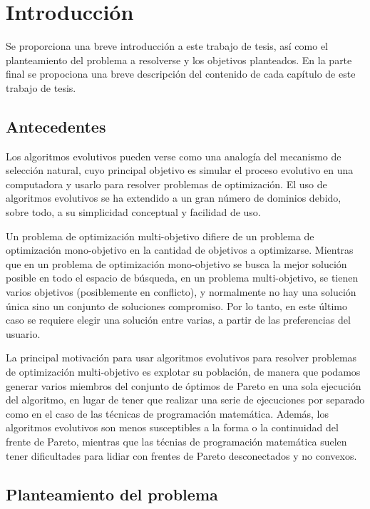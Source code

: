 \chapter*{Introducci\'on}
  Se proporciona una breve introducci\'on a este trabajo de tesis, as\'i como el planteamiento del problema 
  a resolverse y los objetivos planteados. En la parte final se propociona una breve descripci\'on 
  del contenido de cada cap\'itulo de este trabajo de tesis.

\section*{Antecedentes}

  Los algoritmos evolutivos pueden verse como una analog\'ia del mecanismo de selecci\'on natural, cuyo principal objetivo es 
  simular el proceso evolutivo en una computadora y usarlo para resolver problemas de optimizaci\'on. El uso de 
  algoritmos evolutivos se ha extendido a un gran n\'umero de dominios debido, sobre todo, a su simplicidad conceptual
  y facilidad de uso.
  
  Un problema de optimizaci\'on multi-objetivo difiere de un problema de  optimizaci\'on mono-objetivo en la cantidad de 
  objetivos a optimizarse. Mientras que en un problema de optimizaci\'on mono-objetivo se busca la mejor soluci\'on posible 
  en todo el espacio de b\'usqueda, en un problema multi-objetivo, se tienen varios objetivos (posiblemente 
  en conflicto), y normalmente no hay una soluci\'on \'unica sino un conjunto de soluciones compromiso. Por lo tanto, en este 
  \'ultimo caso se requiere elegir una soluci\'on entre varias, a partir de las preferencias del usuario.
  
  La principal motivaci\'on para usar algoritmos evolutivos para resolver problemas de optimizaci\'on multi-objetivo  
  es explotar su poblaci\'on, de manera que podamos generar varios miembros del conjunto de \'optimos de Pareto en una sola 
  ejecuci\'on del algoritmo, en lugar de tener que realizar una serie de ejecuciones por separado como en el caso de las 
  t\'ecnicas de programaci\'on matem\'atica. Adem\'as, los algoritmos evolutivos son menos susceptibles a la forma o la 
  continuidad del frente de Pareto, mientras que las t\'ecnias de programaci\'on matem\'atica suelen tener dificultades 
  para lidiar con frentes de Pareto desconectados y no convexos.

\section*{Planteamiento del problema}

